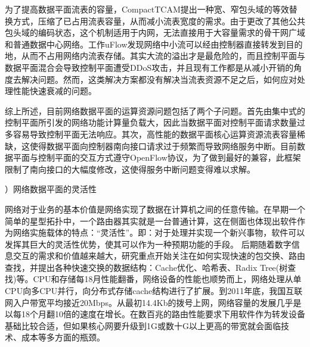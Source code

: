 为了提高数据平面流表的容量，CompactTCAM\cite{kannan2013compact}提出一种宽、窄包头域的等效替换方式，压缩了已占用流表容量，从而减小流表宽度的需求。由于更改了其他公共包头域的编码状态，这个机制适用于内网，无法直接用于大容量需求的骨干网广域和普通数据中心网络。工作uFlow\cite{zhengpeng2018uflow}发现网络中小流可以经由控制器直接转发到目的地，从而不占用网络内流表存储。其实大流的溢出才是最危险的，而且控制平面与数据平面混合会导致控制平面遭受DDoS攻击，并且现有工作都是从减小开销的角度去解决问题。然而，这类解决方案都没有解决当流表资源不足之后，如何应对处理性能快速衰减的问题。

综上所述，目前网络数据平面的运算资源问题包括了两个子问题。首先由集中式的控制平面所引发的网络功能计算量负载大，因此当数据平面对控制平面请求数量过多容易导致控制平面无法响应。其次，高性能的数据平面核心运算资源流表容量稀缺，这使得数据平面向控制器南向接口请求过于频繁而导致网络服务中断。目前数据平面与控制平面的交互方式遵守OpenFlow协议，为了做到最好的兼容，此框架限制了南向接口的大幅度修改，这使得服务中断问题变得难以求解。



\label{chap122}

{）网络数据平面的灵活性}


网络对于业务的基本价值是网络实现了数据在计算机之间的任意传输。在早期一个简单的星型拓扑中，一个路由器其实就是一台普通计算，这在侧面也体现出软件作为网络实施载体的特点：“灵活性”。即：对于处理并实现一个新兴事物，软件可以发挥其巨大的灵活性优势，使其可以作为一种预期功能的手段。
后期随着数字信息交互的需求和价值越来越大，研究重点开始关注在如何实现快速的包交换、路由查找，并提出各种快速交换的数据结构：Cache优化、哈希表、Radix Tree(树查找)等。CPU和存储每18月性能翻番，网络设备的性能也顺势而上，网络处理从单CPU向多CPU并行，向分布式存储cache结构进行了扩展。到2011年底，我国互联网入户带宽平均接近20Mbps。从最初14.4Kb的拨号上网，网络容量的发展几乎是以每18个月翻10倍的速度在增长。在数百兆的路由性能要求下用软件作为转发设备基础比较合适，但如果核心网要升级到1G或数十G以上更高的带宽就会面临技术、成本等多方面的瓶颈。






